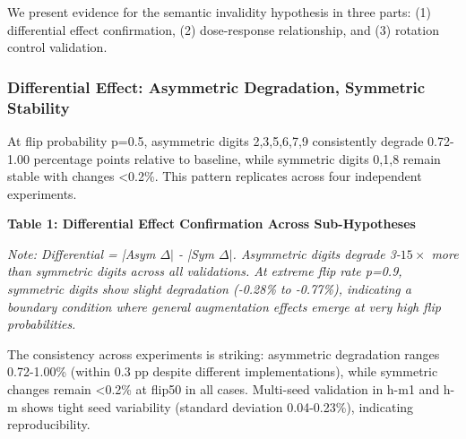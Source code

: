 
We present evidence for the semantic invalidity hypothesis in three parts: (1) differential effect confirmation, (2) dose-response relationship, and (3) rotation control validation.

\subsubsection{Differential Effect: Asymmetric Degradation, Symmetric Stability}

At flip probability p=0.5, asymmetric digits {2,3,5,6,7,9} consistently degrade 0.72-1.00 percentage points relative to baseline, while symmetric digits {0,1,8} remain stable with changes <0.2\%. This pattern replicates across four independent experiments.

\textbf{Table 1: Differential Effect Confirmation Across Sub-Hypotheses}

\begin{table}[htbp]
\centering
{}
\end{table}

\textit{Note: Differential = |Asym $\Delta |$ - |Sym $\Delta |$. Asymmetric digits degrade 3-$15\times$ more than symmetric digits across all validations. At extreme flip rate p=0.9, symmetric digits show slight degradation (-0.28\% to -0.77\%), indicating a boundary condition where general augmentation effects emerge at very high flip probabilities.}

The consistency across experiments is striking: asymmetric degradation ranges 0.72-1.00\% (within 0.3 pp despite different implementations), while symmetric changes remain <0.2\% at flip50 in all cases. Multi-seed validation in h-m1 and h-m shows tight seed variability (standard deviation 0.04-0.23\%), indicating reproducibility.

